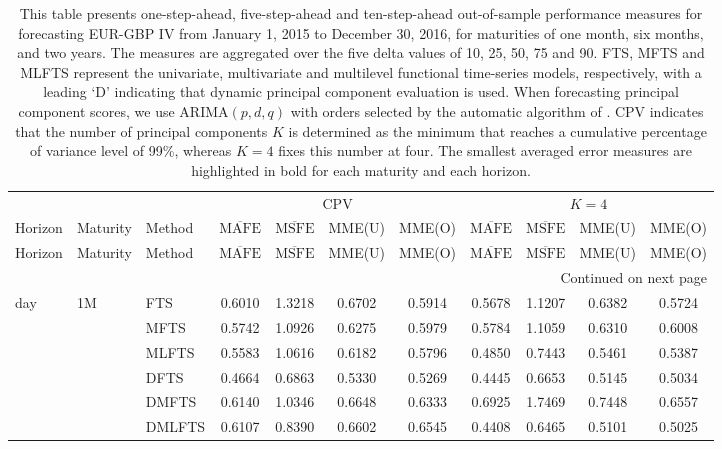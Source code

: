 \documentclass[12pt,a4paper]{article}
\begin{document}
\begin{center}
\tabcolsep 0.067in
\renewcommand{\arraystretch}{0.95}
\begin{small}
\begin{longtable}{@{}lllcccccccc@{}}
\caption{\small{This table presents one-step-ahead, five-step-ahead and ten-step-ahead out-of-sample performance measures for forecasting EUR-GBP IV from January 1, 2015 to December 30, 2016, for maturities of one month, six months, and two years. The measures are aggregated over the five delta values of 10, 25, 50, 75 and 90. FTS, MFTS and MLFTS represent the univariate, multivariate and multilevel functional time-series models, respectively, with a leading `D' indicating that dynamic principal component evaluation is used. When forecasting principal component scores, we use ARIMA$(p, d, q)$ with orders selected by the automatic algorithm of \cite{HK08}. CPV indicates that the number of principal components $K$ is determined as the minimum that reaches a cumulative percentage of variance level of 99\%, whereas $K=4$ fixes this number at four. The smallest averaged error measures are highlighted in bold for each maturity and each horizon.}}\label{tab:5}\\
\toprule
& &    & \multicolumn{4}{c}{CPV} & \multicolumn{4}{c}{$K = 4$} \\
Horizon & Maturity & Method& $\overline{\text{MAFE}}$ & $\overline{\text{MSFE}}$ & MME(U) & MME(O) & $\overline{\text{MAFE}}$ & $\overline{\text{MSFE}}$ & MME(U) & MME(O)  \\\hline
\endfirsthead
Horizon & Maturity & Method  & $\overline{\text{MAFE}}$ & $\overline{\text{MSFE}}$ & MME(U) & MME(O) & $\overline{\text{MAFE}}$ & $\overline{\text{MSFE}}$ & MME(U) & MME(O)   \\\hline
\endhead
\hline  \multicolumn{11}{r}{{Continued on next page}} \\ 
\endfoot
\endlastfoot
1 day & 1M & FTS  & 0.6010 & 1.3218 & 0.6702 & 0.5914 & 0.5678 & 1.1207 & 0.6382 & 0.5724 \\ 
& & MFTS & 0.5742 & 1.0926 & 0.6275 & 0.5979 & 0.5784 & 1.1059 & 0.6310 & 0.6008 \\ 
& & MLFTS & 0.5583 & 1.0616 & 0.6182 & 0.5796 & 0.4850 & 0.7443 & 0.5461 & 0.5387 \\
& & DFTS & 0.4664 & 0.6863 & 0.5330 & 0.5269 & 0.4445 & 0.6653 & 0.5145 & 0.5034 \\ 
& & DMFTS & 0.6140 & 1.0346 & 0.6648 & 0.6333 & 0.6925 & 1.7469 & 0.7448 & 0.6557 \\ 
& & DMLFTS & 0.6107 & 0.8390 & 0.6602 & 0.6545 & 0.4408 & 0.6465 & 0.5101 & 0.5025 \\

\end{longtable}
\end{small}
\end{center}
\end{document}
